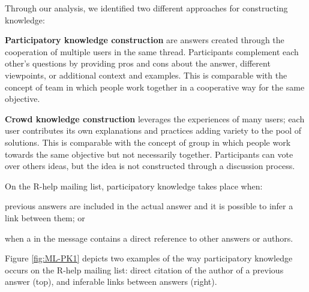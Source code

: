 
    Through our analysis, we identified two different approaches for constructing knowledge:
    \begin{packed_enum}
        \item \textbf{Participatory knowledge construction} are answers created through the cooperation of multiple users in the same thread.
        Participants complement each other's questions by providing pros and cons about the answer, different viewpoints, or additional context and examples.
        This is comparable with the concept of team in which people work together in a cooperative way for the same objective.

        \item \textbf{Crowd knowledge construction} leverages the experiences of many users; each user contributes its own explanations and practices adding variety to the pool of solutions.
        This is comparable with the concept of group in which people work towards the same objective but not necessarily together.
        Participants can vote over others ideas, but the idea is not constructed through a discussion process.
    \end{packed_enum}

    On the R-help mailing list, participatory knowledge takes place when:
    \begin{enumerate*}[label=(\arabic*)]
    \item previous answers are included in the actual answer and it is possible to infer a link between them; or
    \item when a in the message contains a direct reference to other answers or authors.
    \end{enumerate*}
    Figure \ref{fig:ML-PK1} depicts two examples of the way participatory knowledge occurs on the R-help mailing list:
    direct citation of the author of a previous answer (top), and inferable links between answers (right).

